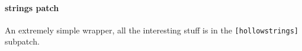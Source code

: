 \paragraph{strings patch}
An extremely simple wrapper, all the interesting stuff is in the \verb+[hollowstrings]+
subpatch.
